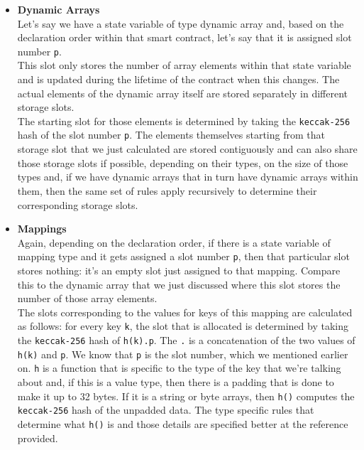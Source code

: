 \begin{itemize}
\item
  \textbf{Dynamic Arrays}\\

  Let's say we have a state variable of type dynamic array and, based on
  the declaration order within that smart contract, let's say that it is
  assigned slot number \texttt{p}.\\

  This slot only stores the number of array elements within that state
  variable and is updated during the lifetime of the contract when this
  changes. The actual elements of the dynamic array itself are stored
  separately in different storage slots.\\

  The starting slot for those elements is determined by taking the
  \texttt{keccak-256} hash of the slot number \texttt{p}. The elements
  themselves starting from that storage slot that we just calculated are
  stored contiguously and can also share those storage slots if
  possible, depending on their types, on the size of those types and, if
  we have dynamic arrays that in turn have dynamic arrays within them,
  then the same set of rules apply recursively to determine their
  corresponding storage slots.
\item
  \textbf{Mappings}\\

  Again, depending on the declaration order, if there is a state
  variable of mapping type and it gets assigned a slot number
  \texttt{p}, then that particular slot stores nothing: it's an empty
  slot just assigned to that mapping. Compare this to the dynamic array
  that we just discussed where this slot stores the number of those
  array elements.\\

  The slots corresponding to the values for keys of this mapping are
  calculated as follows: for every key \texttt{k}, the slot that is
  allocated is determined by taking the \texttt{keccak-256} hash of
  \texttt{h(k).p}. The \texttt{.} is a concatenation of the two values
  of \texttt{h(k)} and \texttt{p}. We know that \texttt{p} is the slot
  number, which we mentioned earlier on. \texttt{h} is a function that
  is specific to the type of the key that we're talking about and, if
  this is a value type, then there is a padding that is done to make it
  up to 32 bytes. If it is a string or byte arrays, then \texttt{h()}
  computes the \texttt{keccak-256} hash of the unpadded data. The type
  specific rules that determine what \texttt{h()} is and those details
  are specified better at the reference provided.
\end{itemize}

